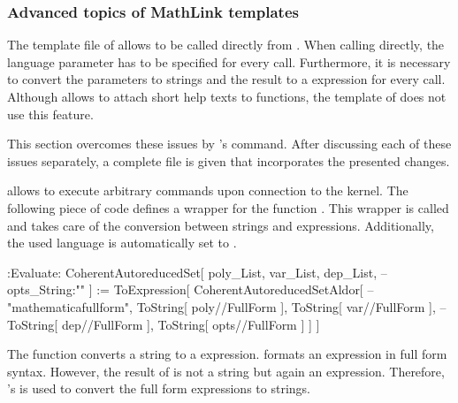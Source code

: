 \subsubsection{Advanced topics of MathLink templates}

The template file of  allows \exportedsymbol to be called directly from \Mathematica. When calling \exportedsymbol directly, the language parameter has to be specified for every call. Furthermore, it is necessary to convert the parameters to strings and the result to a \Mathematica expression for every call. Although \Mathematica allows to attach short help texts to functions, the \MathLink template of  does not use this feature. 

This section overcomes these issues by \MathLink's  command. After discussing each of these issues separately, a complete \MathLink file is given that incorporates the presented changes.

 allows to execute arbitrary \Mathematica commands upon connection to the \Mathematica kernel. The following piece of code defines a wrapper for the function . This wrapper is called  and takes care of the conversion between strings and \Mathematica expressions. Additionally, the used language is automatically set to .

\begin{mathematicaprogram}
:Evaluate:      CoherentAutoreducedSet[ poly_List, var_List, dep_List,            --
    opts_String:"" ] := ToExpression[ CoherentAutoreducedSetAldor[                --
    "mathematicafullform", ToString[ poly//FullForm ], ToString[ var//FullForm ], --
    ToString[ dep//FullForm ], ToString[ opts//FullForm ] ] ]
\end{mathematicaprogram}

The function  converts a string to a \Mathematica expression.  formats an expression in full form syntax. However, the result of  is not a string but again an expression. Therefore, \Mathematica's  is used to convert the full form expressions to strings. %

